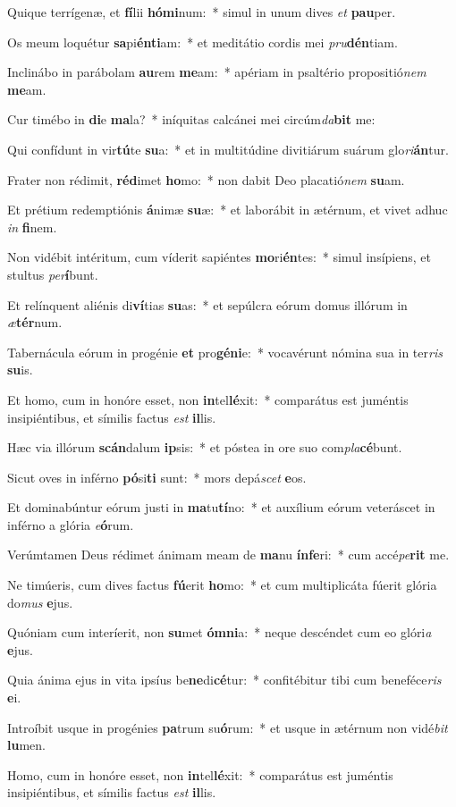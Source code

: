 \item Quique terrígenæ, et \textbf{fí}lii \textbf{hó}\textbf{mi}num:~* simul in unum dives \textit{et} \textbf{pau}per.
\item Os meum loquétur \textbf{sa}pi\textbf{én}\textbf{ti}am:~* et meditátio cordis mei \textit{pru}\textbf{dén}tiam.
\item Inclinábo in parábolam \textbf{au}rem \textbf{me}am:~* apériam in psaltério propositió\textit{nem} \textbf{me}am.
\item Cur timébo in \textbf{di}e \textbf{ma}la?~* iníquitas calcánei mei circúm\textit{da}\textbf{bit} me:
\item Qui confídunt in vir\textbf{tú}te \textbf{su}a:~* et in multitúdine divitiárum suárum glo\textit{ri}\textbf{án}tur.
\item Frater non rédimit, \textbf{réd}imet \textbf{ho}mo:~* non dabit Deo placatió\textit{nem} \textbf{su}am.
\item Et prétium redemptiónis \textbf{á}nimæ \textbf{su}æ:~* et laborábit in ætérnum, et vivet adhuc \textit{in} \textbf{fi}nem.
\item Non vidébit intéritum, cum víderit sapiéntes \textbf{mo}ri\textbf{én}tes:~* simul insípiens, et stultus \textit{per}\textbf{í}bunt.
\item Et relínquent aliénis di\textbf{ví}tias \textbf{su}as:~* et sepúlcra eórum domus illórum in \textit{æ}\textbf{tér}num.
\item Tabernácula eórum in progénie \textbf{et} pro\textbf{gé}\textbf{ni}e:~* vocavérunt nómina sua in ter\textit{ris} \textbf{su}is.
\item Et homo, cum in honóre esset, non \textbf{in}tel\textbf{lé}xit:~* comparátus est juméntis insipiéntibus, et símilis factus \textit{est} \textbf{il}lis.
\item Hæc via illórum \textbf{scán}dalum \textbf{ip}sis:~* et póstea in ore suo com\textit{pla}\textbf{cé}bunt.
\item Sicut oves in inférno \textbf{pó}si\textbf{ti} sunt:~* mors depá\textit{scet} \textbf{e}os.
\item Et dominabúntur eórum justi in \textbf{ma}tu\textbf{tí}no:~* et auxílium eórum veteráscet in inférno a glória \textit{e}\textbf{ó}rum.
\item Verúmtamen Deus rédimet ánimam meam de \textbf{ma}nu \textbf{ín}\textbf{fe}ri:~* cum accé\textit{pe}\textbf{rit} me.
\item Ne timúeris, cum dives factus \textbf{fú}erit \textbf{ho}mo:~* et cum multiplicáta fúerit glória do\textit{mus} \textbf{e}jus.
\item Quóniam cum interíerit, non \textbf{su}met \textbf{óm}\textbf{ni}a:~* neque descéndet cum eo glóri\textit{a} \textbf{e}jus.
\item Quia ánima ejus in vita ipsíus be\textbf{ne}di\textbf{cé}tur:~* confitébitur tibi cum beneféce\textit{ris} \textbf{e}i.
\item Introíbit usque in progénies \textbf{pa}trum su\textbf{ó}rum:~* et usque in ætérnum non vidé\textit{bit} \textbf{lu}men.
\item Homo, cum in honóre esset, non \textbf{in}tel\textbf{lé}xit:~* comparátus est juméntis insipiéntibus, et símilis factus \textit{est} \textbf{il}lis.
